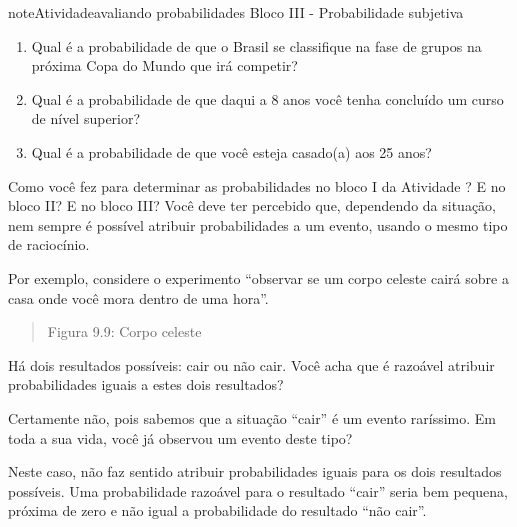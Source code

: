 \begin{sphinxadmonition}{note}{Atividade}{avaliando probabilidades}
Bloco III - Probabilidade subjetiva
\begin{enumerate}
\item {} 
Qual é a probabilidade de que o Brasil se classifique na fase de grupos na próxima Copa do Mundo que irá competir?

\item {} 
Qual é a probabilidade de que daqui a 8 anos você tenha concluído um curso de nível superior?

\item {} 
Qual é a probabilidade de que você esteja casado(a) aos 25 anos?

\end{enumerate}
\end{sphinxadmonition}


\label{\detokenize{PE511-1:sec-interpretacoes}}\label{\detokenize{PE511-1:organizando-as-ideias-probabilidade-conceitos-basicos}}\label{\detokenize{PE511-1::doc}}
Como você fez para determinar as probabilidades no bloco I da Atividade ? E no bloco II? E no bloco III? Você deve ter percebido que, dependendo da situação, nem sempre é possível atribuir probabilidades a um evento, usando o mesmo tipo de raciocínio.

Por exemplo, considere o experimento “observar se um corpo celeste cairá sobre a casa onde você mora dentro de uma hora”.
\begin{quote}

\begin{figure}[H]
\centering

\noindent{}
\end{figure}

Figura 9.9: Corpo celeste
\end{quote}

Há dois resultados possíveis: cair ou não cair. Você acha que é razoável atribuir probabilidades iguais a estes dois resultados?

Certamente não, pois sabemos que a situação “cair” é um evento raríssimo. Em toda a sua vida, você já observou um evento deste tipo?

Neste caso, não faz sentido atribuir probabilidades iguais para os dois resultados possíveis. Uma probabilidade razoável para o resultado “cair” seria bem pequena, próxima de zero e não igual a probabilidade do resultado “não cair”.

